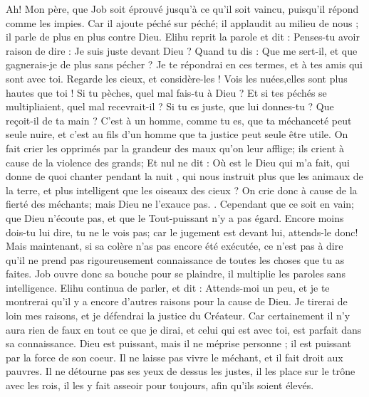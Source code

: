 \begin{multicols}{2}
Ah! Mon père, que Job soit éprouvé jusqu'à ce qu'il soit vaincu, puisqu'il répond comme les impies.
Car il ajoute péché sur péché; il applaudit au milieu de nous ; il parle de plus en plus contre Dieu.
\VerseOne{}Elihu reprit la parole et dit :
Penses-tu avoir raison de dire : Je suis juste devant Dieu ?
Quand tu dis : Que me sert-il, et que gagnerais-je de plus sans pécher ?
Je te répondrai en ces termes, et à tes amis qui sont avec toi.
Regarde les cieux, et considère-les ! Vois les nuées,elles sont plus hautes que toi !
Si tu pèches, quel mal fais-tu à Dieu ? Et si tes péchés se multipliaient, quel mal recevrait-il ?
Si tu es juste, que lui donnes-tu ? Que reçoit-il de ta main ?
C'est à un homme, comme tu es, que ta méchanceté peut seule nuire, et c'est au fils d'un homme que ta justice peut seule être utile.
On fait crier les opprimés par la grandeur des maux qu'on leur afflige; ils crient à cause de la violence des grands;
Et nul ne dit : Où est le Dieu qui m'a fait, qui donne de quoi chanter pendant la nuit ,
qui nous instruit plus que les animaux de la terre, et plus intelligent que les oiseaux des cieux ?
On crie donc à cause de la fierté des méchants; mais Dieu ne l'exauce pas.
.
 Cependant que ce soit en vain; que Dieu n'écoute pas, et que le Tout-puissant n'y a pas égard.
Encore moins dois-tu lui dire, tu ne le vois pas; car le jugement est devant lui, attends-le donc!
Mais maintenant, si sa colère n'as pas encore été exécutée, ce n'est pas à dire qu'il ne prend pas rigoureusement connaissance de toutes les choses que tu as faites.
Job ouvre donc sa bouche pour se plaindre, il multiplie les paroles sans intelligence.
\VerseOne{}Elihu continua de parler, et dit :
Attends-moi un peu, et je te montrerai qu'il y a encore d'autres raisons pour la cause de Dieu.
Je tirerai de loin mes raisons, et je défendrai la justice du Créateur.
Car certainement il n'y aura rien de faux en tout ce que je dirai, et celui qui est avec toi, est parfait dans sa connaissance.
Dieu est puissant, mais il ne méprise personne ; il est puissant par la force de son coeur.
Il ne laisse pas vivre le méchant, et il fait droit aux pauvres.
Il ne détourne pas ses yeux de dessus les justes, il les place sur le trône avec les rois, il les y fait asseoir pour toujours, afin qu'ils soient élevés.

\end{multicols}
